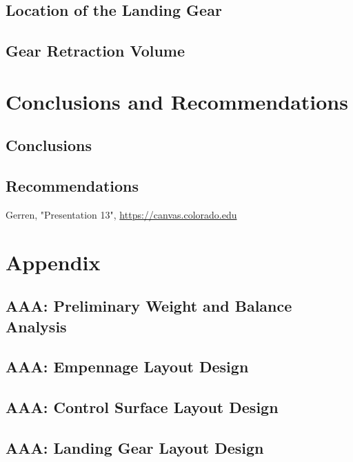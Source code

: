 \documentclass[conf]{new-aiaa}
\begin{document}
\subsection{Location of the Landing Gear}

\subsection{Gear Retraction Volume}

\section{Conclusions and Recommendations}
\subsection{Conclusions}

\subsection{Recommendations}

\begin{thebibliography}{99}


 Gerren, "Presentation 13", \url{https://canvas.colorado.edu}

\end{thebibliography}

\section{Appendix}



\subsection{AAA: Preliminary Weight and Balance Analysis}

\subsection{AAA: Empennage Layout Design}

\subsection{AAA: Control Surface Layout Design}

\subsection{AAA: Landing Gear Layout Design}
\end{document}
